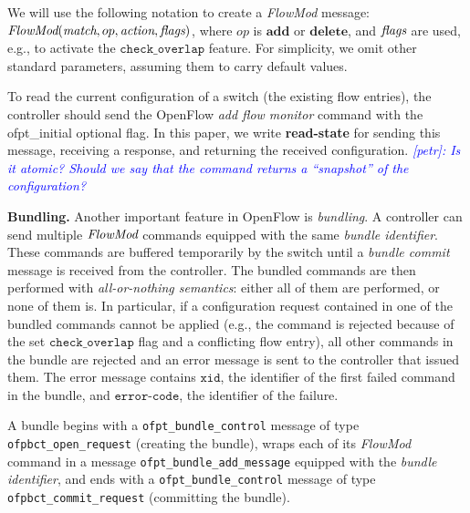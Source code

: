 \documentclass[conference]{sigcomm-alternate}
\newcommand{\add}{\textbf{add}\xspace}
\newcommand{\dele}{\textbf{delete}\xspace}
\newcommand{\FlowMod}{\emph{FlowMod}\xspace}
\newcommand{\match}{\emph{match}\xspace}
\newcommand{\action}{\emph{action}\xspace}
\newcommand{\flags}{\emph{flags}\xspace}
\newcommand{\checko}{\texttt{check\_overlap}\xspace}
\newcommand{\stefan}[1]{\textit{\textcolor{red}{[stefan]: #1}}} %
\newcommand{\petr}[1]{\textit{\textcolor{blue}{[petr]: #1}}} %
\newcommand{\xid}{\texttt{xid}}
\newcommand{\ecode}{\texttt{error-code}}
\begin{document}
We will use the following notation to create a \emph{FlowMod} message:
$\FlowMod(\match, op, \action, \flags)$, where
$op$ is $\add$ or $\dele$, and $\flags$ are used, e.g.,  to activate the $\checko$
feature.
For simplicity, we omit other standard parameters, assuming them to carry
default values.

To read the current configuration of a switch (the existing flow entries), the controller should send
the OpenFlow \emph{add flow monitor} command with the \textsf{ofpt\_initial} optional flag.
In this paper, we write \textbf{read-state} for sending
this message, receiving a response, and returning the received configuration.
\petr{Is it atomic? Should we say that the command returns a ``snapshot'' of the
  configuration?}

\vspace{1mm}
\noindent\textbf{Bundling.}
%
Another important feature in OpenFlow is \emph{bundling}. %
A controller can send multiple $\FlowMod$ commands  equipped with
the same \emph{bundle identifier}.
These commands are buffered temporarily by
the switch until a \emph{bundle commit} message is received from the
controller.
The bundled commands are then performed with \emph{all-or-nothing semantics}:
either all of them are performed, or none of them is.
In particular, if a configuration request contained in one of the bundled commands cannot
be applied (e.g., the command is rejected because of the set
$\checko$ flag and a conflicting flow entry), all  other commands in
the bundle are rejected and an error
message is sent to the controller that issued them.
The error message contains $\xid$, the identifier of the first failed command in the
bundle, and $\ecode$, the identifier of the failure.

A bundle begins with a  \texttt{ofpt\_bundle\_control} message of type
\texttt{ofpbct\_open\_request} (creating the bundle), wraps
each of its \emph{FlowMod} command in a message
\texttt{ofpt\_bundle\_add\_message} equipped with the \emph{bundle
  identifier}, and ends with a \texttt{ofpt\_bundle\_control} message of
type \texttt{ofpbct\_commit\_request} (committing the bundle).
\end{document}
